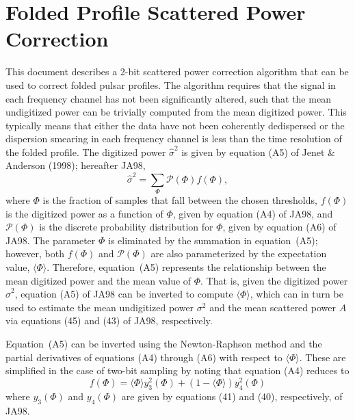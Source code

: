 \documentclass[12pt]{article}
\begin{document}
\section{Folded Profile Scattered Power Correction}

This document describes a 2-bit scattered power correction algorithm
that can be used to correct folded pulsar profiles.  The algorithm
requires that the signal in each frequency channel has not been
significantly altered, such that the mean undigitized power can be
trivially computed from the mean digitized power.  This typically
means that either the data have not been coherently dedispersed or the
dispersion smearing in each frequency channel is less than the time
resolution of the folded profile.
%
The digitized power $\hat\sigma^2$ is given by equation (A5) of
Jenet \& Anderson (1998); hereafter JA98,
%
\[
\hat\sigma^2 = \sum_\Phi {\mathcal P}(\Phi)f(\Phi),
\label{eqn:A5}
\]
where $\Phi$ is the fraction of samples that fall between the chosen
thresholds, $f(\Phi)$ is the digitized power as a function of $\Phi$,
given by equation (A4) of JA98, and ${\mathcal P}(\Phi)$ is the
discrete probability distribution for $\Phi$, given by equation (A6)
of JA98.
%
The parameter $\Phi$ is eliminated by the summation in equation~(A5);
however, both $f(\Phi)$ and ${\mathcal P}(\Phi)$ are also
parameterized by the expectation value, $\langle\Phi\rangle$.
%
Therefore, equation~(A5) represents the relationship between the mean
digitized power and the mean value of $\Phi$.
%
That is, given the digitized power $\hat\sigma^2$, equation (A5) of
JA98 can be inverted to compute $\langle\Phi\rangle$, which can in
turn be used to estimate the mean undigitized power $\sigma^2$ and the
mean scattered power $A$ via equations (45) and (43) of JA98,
respectively.

Equation~(A5) can be inverted using the Newton-Raphson method and the
partial derivatives of equations (A4) through (A6) with respect to
$\langle\Phi\rangle$.
%
These are simplified in the case of two-bit sampling by noting that
equation (A4) reduces to
%
\[
f(\Phi) = \langle\Phi\rangle y_3^2(\Phi)  + (1-\langle\Phi\rangle) y_4^2(\Phi)
\]
%
where $y_3(\Phi)$ and $y_4(\Phi)$ are given by equations (41)
and (40), respectively, of JA98.
\end{document}

